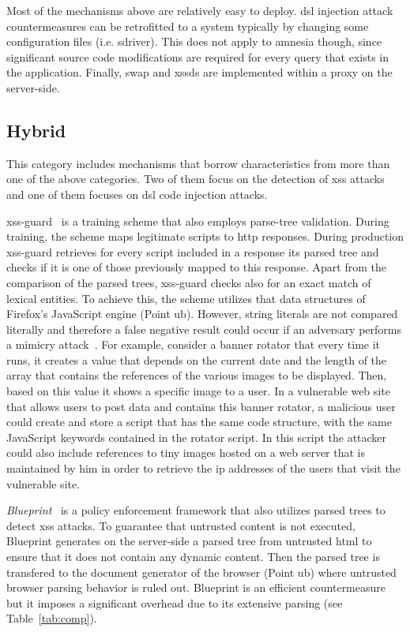 \documentclass[conference]{IEEEtran}
\begin{document}
Most of the mechanisms above are relatively easy to deploy.
{\sc dsl} injection attack countermeasures
can be retrofitted to a system typically by changing
some configuration files (i.e. {\sc sd}river). This does not apply
to {\sc amnesia} though, since significant source code
modifications are required for every query that exists
in the application. Finally, {\sc swap} and {\sc xssds}
are implemented within a proxy on the server-side.

\subsection{Hybrid}
\label{sec:hybrid}

This category includes mechanisms that borrow
characteristics from more than one of the above categories.
Two of them focus on the detection of {\sc xss}
attacks and one of them focuses on {\sc dsl} code
injection attacks.

{\sc xss-guard}~\cite{BV08} is a training scheme that also employs
parse-tree validation. During training, the scheme maps legitimate
scripts to {\sc http} responses. During production {\sc xss-guard}
retrieves for every script included in a response its parsed tree and
checks if it is one of those previously mapped to this response. Apart
from the comparison of the parsed trees, {\sc xss-guard} checks also
for an exact match of lexical entities. To achieve this, the scheme
utilizes that data structures of Firefox's JavaScript engine (Point
{\sc ub}). However, string literals are not compared literally and
therefore a false negative result could occur if an adversary performs
a mimicry attack~\cite{WS02}. For example, consider a banner rotator
that every time it runs, it creates a value that depends on the
current date and the length of the array that contains the references
of the various images to be displayed. Then, based on this value it
shows a specific image to a user. In a vulnerable web site that allows
users to post data and contains this banner rotator, a malicious user
could create and store a script that has the same code structure, with
the same JavaScript keywords contained in the rotator script.
In this script the attacker could also include references to tiny
images hosted on a web server that is maintained by him in order to
retrieve the {\sc ip} addresses of the users that visit the vulnerable
site.

{\it Blueprint}~\cite{LV09} is a policy enforcement framework that
also utilizes parsed trees to detect {\sc xss} attacks. To guarantee
that untrusted content is not executed, Blueprint generates on the
server-side a parsed tree from untrusted {\sc html} to ensure that it
does not contain any dynamic content. Then the parsed tree is
transfered to the document generator of the browser (Point {\sc ub})
where untrusted browser parsing behavior is ruled out. Blueprint is an
efficient countermeasure but it imposes a significant overhead due to
its extensive parsing (see Table~\ref{tab:comp}).
\end{document}
